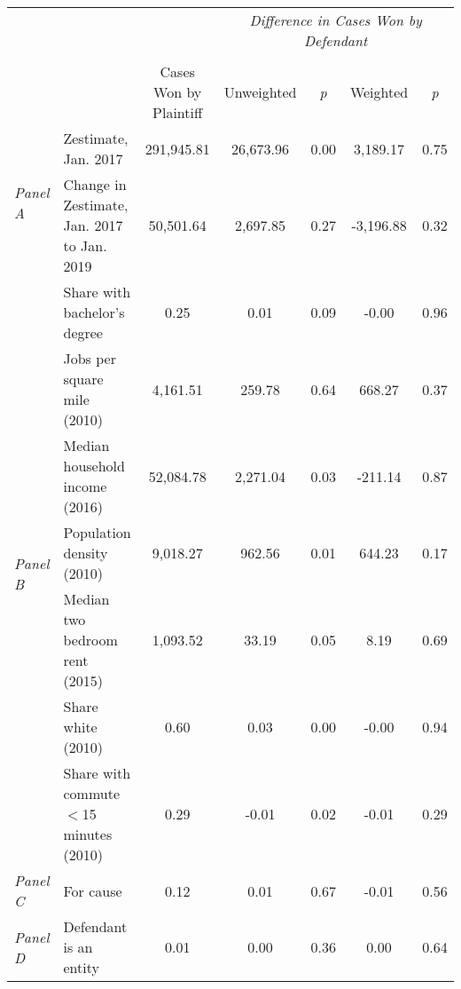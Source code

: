 \begin{tabular}{llccccc}
\toprule
 &  & \textit{} & \multicolumn{4}{c}{\textit{Difference in Cases Won by Defendant}} \\
\cline{4-7}
\\
 &  & Cases Won by Plaintiff & Unweighted & \emph{p} & Weighted & \emph{p} \\
\midrule
\multirow[c]{2}{3cm}{\textit{Panel A}} & Zestimate, Jan. 2017 & 291,945.81 & 26,673.96 & 0.00 & 3,189.17 & 0.75 \\
 & Change in Zestimate, Jan. 2017 to Jan. 2019 & 50,501.64 & 2,697.85 & 0.27 & -3,196.88 & 0.32 \\
\cline{1-7}
\multirow[c]{7}{3cm}{\textit{Panel B}} & Share with bachelor's degree & 0.25 & 0.01 & 0.09 & -0.00 & 0.96 \\
 & Jobs per square mile (2010) & 4,161.51 & 259.78 & 0.64 & 668.27 & 0.37 \\
 & Median household income (2016) & 52,084.78 & 2,271.04 & 0.03 & -211.14 & 0.87 \\
 & Population density (2010) & 9,018.27 & 962.56 & 0.01 & 644.23 & 0.17 \\
 & Median two bedroom rent (2015) & 1,093.52 & 33.19 & 0.05 & 8.19 & 0.69 \\
 & Share white (2010) & 0.60 & 0.03 & 0.00 & -0.00 & 0.94 \\
 & Share with commute $<$15 minutes (2010) & 0.29 & -0.01 & 0.02 & -0.01 & 0.29 \\
\cline{1-7}
\textit{Panel C} & For cause & 0.12 & 0.01 & 0.67 & -0.01 & 0.56 \\
\cline{1-7}
\textit{Panel D} & Defendant is an entity & 0.01 & 0.00 & 0.36 & 0.00 & 0.64 \\
\cline{1-7}
\bottomrule
\end{tabular}
